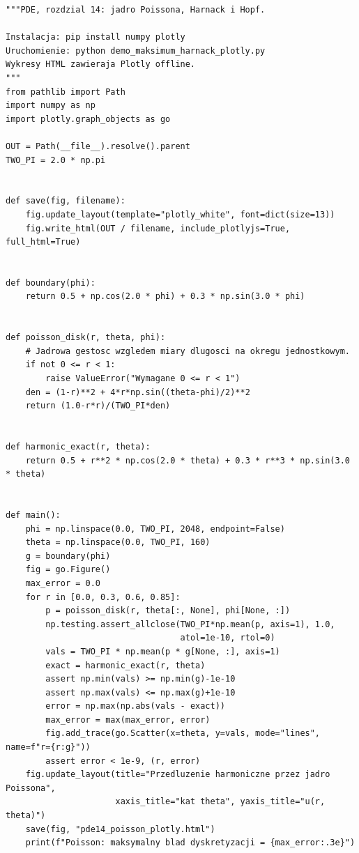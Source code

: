 \begin{lstlisting}[style=pythonpde,caption={Jądro Poissona, nierówność Harnacka i lemat Hopfa (Plotly)},label={code:pde14-plotly}]
"""PDE, rozdzial 14: jadro Poissona, Harnack i Hopf.

Instalacja: pip install numpy plotly
Uruchomienie: python demo_maksimum_harnack_plotly.py
Wykresy HTML zawieraja Plotly offline.
"""
from pathlib import Path
import numpy as np
import plotly.graph_objects as go

OUT = Path(__file__).resolve().parent
TWO_PI = 2.0 * np.pi


def save(fig, filename):
    fig.update_layout(template="plotly_white", font=dict(size=13))
    fig.write_html(OUT / filename, include_plotlyjs=True, full_html=True)


def boundary(phi):
    return 0.5 + np.cos(2.0 * phi) + 0.3 * np.sin(3.0 * phi)


def poisson_disk(r, theta, phi):
    # Jadrowa gestosc wzgledem miary dlugosci na okregu jednostkowym.
    if not 0 <= r < 1:
        raise ValueError("Wymagane 0 <= r < 1")
    den = (1-r)**2 + 4*r*np.sin((theta-phi)/2)**2
    return (1.0-r*r)/(TWO_PI*den)


def harmonic_exact(r, theta):
    return 0.5 + r**2 * np.cos(2.0 * theta) + 0.3 * r**3 * np.sin(3.0 * theta)


def main():
    phi = np.linspace(0.0, TWO_PI, 2048, endpoint=False)
    theta = np.linspace(0.0, TWO_PI, 160)
    g = boundary(phi)
    fig = go.Figure()
    max_error = 0.0
    for r in [0.0, 0.3, 0.6, 0.85]:
        p = poisson_disk(r, theta[:, None], phi[None, :])
        np.testing.assert_allclose(TWO_PI*np.mean(p, axis=1), 1.0,
                                   atol=1e-10, rtol=0)
        vals = TWO_PI * np.mean(p * g[None, :], axis=1)
        exact = harmonic_exact(r, theta)
        assert np.min(vals) >= np.min(g)-1e-10
        assert np.max(vals) <= np.max(g)+1e-10
        error = np.max(np.abs(vals - exact))
        max_error = max(max_error, error)
        fig.add_trace(go.Scatter(x=theta, y=vals, mode="lines", name=f"r={r:g}"))
        assert error < 1e-9, (r, error)
    fig.update_layout(title="Przedluzenie harmoniczne przez jadro Poissona",
                      xaxis_title="kat theta", yaxis_title="u(r, theta)")
    save(fig, "pde14_poisson_plotly.html")
    print(f"Poisson: maksymalny blad dyskretyzacji = {max_error:.3e}")


\end{lstlisting}
